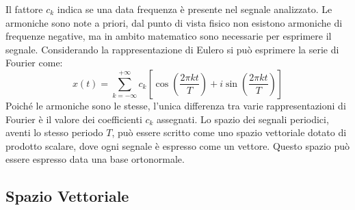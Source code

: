 \documentclass{article}
\numberwithin{equation}{subsection}
\begin{document}
Il fattore $c_k$ indica se una data frequenza è presente nel segnale analizzato. Le armoniche sono note a priori, dal punto di vista fisico non esistono armoniche di frequenze 
negative, ma in ambito matematico sono necessarie per esprimere il segnale. Considerando la rappresentazione di Eulero si può esprimere la serie di Fourier come:
\begin{equation}
    x(t)=\displaystyle\sum_{k=-\infty}^{+\infty}c_k\left[\cos\left(\frac{2\pi k t}{T}\right)+i\sin\left(\frac{2\pi k t}{T}\right)\right]
\end{equation}
Poiché le armoniche sono le stesse, l'unica differenza tra varie rappresentazioni di Fourier è il valore dei coefficienti $c_k$ assegnati. Lo spazio dei segnali periodici, 
aventi lo stesso periodo $T$, può essere scritto come uno spazio vettoriale dotato di prodotto scalare, dove ogni segnale è espresso come un vettore. Questo spazio può essere 
espresso data una base ortonormale.

\subsection{Spazio Vettoriale}
\end{document}
